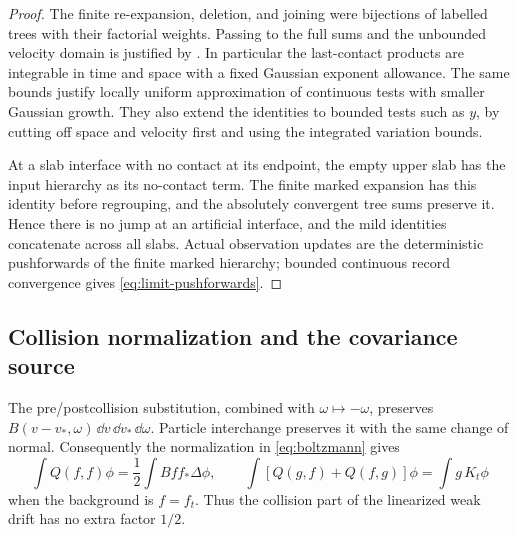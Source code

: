 \begin{proof}
The finite re-expansion, deletion, and joining were bijections of
labelled trees with their factorial weights.  Passing to the full
sums and the unbounded velocity domain is justified by
.
In particular the last-contact products are integrable in time and
space with a fixed Gaussian exponent allowance.  The same bounds
justify locally uniform approximation of continuous tests with
smaller Gaussian growth.  They also extend the identities to bounded
tests such as \(y\), by cutting off space and velocity first and using
the integrated variation bounds.

At a slab interface with no contact at its endpoint, the empty upper
slab has the input hierarchy as its no-contact term.  The finite
marked expansion has this identity before regrouping, and the
absolutely convergent tree sums preserve it.  Hence there is no jump
at an artificial interface, and the mild identities concatenate
across all slabs.  Actual observation updates are the deterministic
pushforwards of the finite marked hierarchy; bounded continuous
record convergence gives \eqref{eq:limit-pushforwards}.
\end{proof}

\subsection{Collision normalization and the covariance source}

The pre/postcollision substitution, combined with
\(\omega\mapsto-\omega\), preserves
\(B(v-v_*,\omega)\,\dd v\,\dd v_*\,\dd\omega\).
Particle interchange preserves it with the same change of normal.
Consequently the normalization in \eqref{eq:boltzmann} gives
\begin{equation}\label{eq:limit-weak-normalization}
 \int Q(f,f)\phi=\frac12\int Bff_*\Delta\phi,\qquad
 \int[Q(g,f)+Q(f,g)]\phi=\int g\,K_t\phi
\end{equation}
when the background is \(f=f_t\).  Thus the collision part of the
linearized weak drift has no extra factor \(1/2\).

